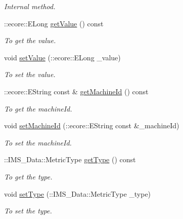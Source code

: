 \begin{DoxyCompactItemize}
\begin{DoxyCompactList}\small\item\em Internal method. \item\end{DoxyCompactList}\item 
::ecore::ELong \hyperlink{classIMS__Data_1_1Threshold_a879c1af21a6d33cb5fc7c0fc8309e780}{getValue} () const 
\begin{DoxyCompactList}\small\item\em To get the value. \item\end{DoxyCompactList}\item 
void \hyperlink{classIMS__Data_1_1Threshold_a3b40d3b673dc086d00faea23b005baac}{setValue} (::ecore::ELong \_\-value)
\begin{DoxyCompactList}\small\item\em To set the value. \item\end{DoxyCompactList}\item 
::ecore::EString const \& \hyperlink{classIMS__Data_1_1Threshold_a8a1439af87f00bf3d78e318281cba421}{getMachineId} () const 
\begin{DoxyCompactList}\small\item\em To get the machineId. \item\end{DoxyCompactList}\item 
void \hyperlink{classIMS__Data_1_1Threshold_a16f207dac746b99c7c73ec5e143c4268}{setMachineId} (::ecore::EString const \&\_\-machineId)
\begin{DoxyCompactList}\small\item\em To set the machineId. \item\end{DoxyCompactList}\item 
::IMS\_\-Data::MetricType \hyperlink{classIMS__Data_1_1Threshold_a7db91aa2d802f6a6dda221a1899266ec}{getType} () const 
\begin{DoxyCompactList}\small\item\em To get the type. \item\end{DoxyCompactList}\item 
void \hyperlink{classIMS__Data_1_1Threshold_a8ca5941ee2ab58fc8f0df145f071fb39}{setType} (::IMS\_\-Data::MetricType \_\-type)
\begin{DoxyCompactList}\small\item\em To set the type. \item\end{DoxyCompactList}\item 

\end{DoxyCompactItemize}
